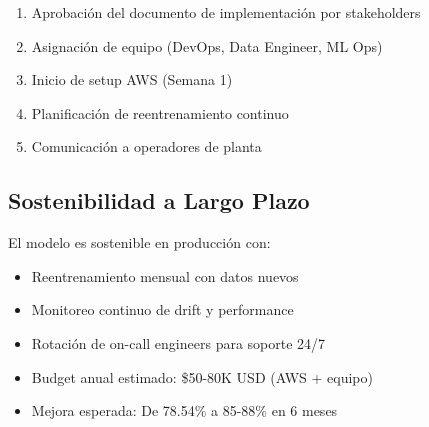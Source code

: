 \documentclass[11pt,letterpaper]{article}
\begin{document}
\begin{enumerate}
  \item Aprobación del documento de implementación por stakeholders
  \item Asignación de equipo (DevOps, Data Engineer, ML Ops)
  \item Inicio de setup AWS (Semana 1)
  \item Planificación de reentrenamiento continuo
  \item Comunicación a operadores de planta
\end{enumerate}

\subsection{Sostenibilidad a Largo Plazo}

El modelo es sostenible en producción con:
\begin{itemize}
  \item Reentrenamiento mensual con datos nuevos
  \item Monitoreo continuo de drift y performance
  \item Rotación de on-call engineers para soporte 24/7
  \item Budget anual estimado: \$50-80K USD (AWS + equipo)
  \item Mejora esperada: De 78.54\% a 85-88\% en 6 meses
\end{itemize}
\end{document}

